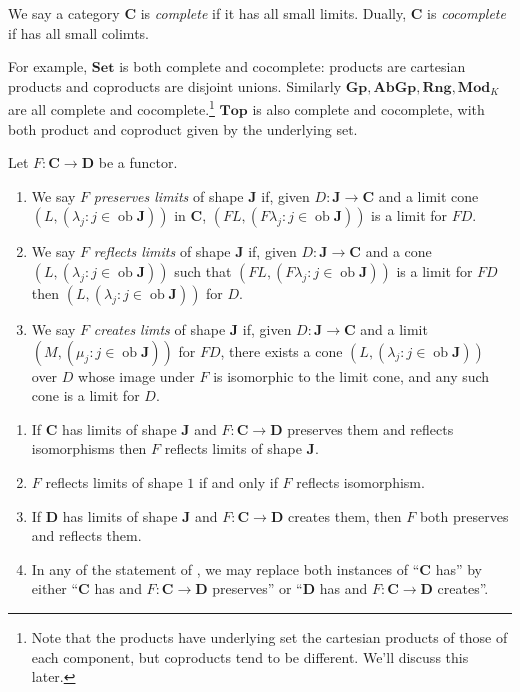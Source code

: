 \documentclass[a4paper]{article}
\renewcommand{\c}[1]{\mathbf{#1}}
\DeclareMathOperator{\ob}{ob}
\newcommand{\Set}{{\c{Set}}}
\newcommand{\Top}{{\c{Top}}}
\begin{document}
\begin{definition}
  We say a category \(\c C\) is \emph{complete} if it has all small limits. Dually, \(\c C\) is \emph{cocomplete} if has all small colimts.
\end{definition}

For example, \(\Set\) is both complete and cocomplete: products are cartesian products and coproducts are disjoint unions. Similarly \(\c{Gp}, \c{AbGp}, \c{Rng}, \c{Mod}_K\) are all complete and cocomplete.\footnote{Note that the products have underlying set the cartesian products of those of each component, but coproducts tend to be different. We'll discuss this later.} \(\Top\) is also complete and cocomplete, with both product and coproduct given by the underlying set.

\begin{definition}
  Let \(F: \c C \to \c D\) be a functor.
  \begin{enumerate}
  \item We say \(F\) \emph{preserves limits} of shape \(\c J\) if, given \(D: \c J \to \c C\) and a limit cone \((L, (\lambda_j: j \in \ob \c J))\) in \(\c C\), \((FL, (F\lambda_j: j \in \ob \c J))\) is a limit for \(FD\).
  \item We say \(F\) \emph{reflects limits} of shape \(\c J\) if, given \(D: \c J \to \c C\) and a cone \((L, (\lambda_j: j \in \ob \c J))\) such that \((FL, (F\lambda_j: j \in \ob \c J))\) is a limit for \(FD\) then \((L, (\lambda_j: j \in \ob \c J))\) for \(D\).
  \item We say \(F\) \emph{creates limts} of shape \(\c J\) if, given \(D: \c J \to \c C\) and a limit \((M, (\mu_j: j \in \ob \c J))\) for \(FD\), there exists a cone \((L, (\lambda_j: j \in \ob \c J))\) over \(D\) whose image under \(F\) is isomorphic to the limit cone, and any such cone is a limit for \(D\).
  \end{enumerate}
\end{definition}

\begin{remark}\leavevmode
  \begin{enumerate}
  \item If \(\c C\) has limits of shape \(\c J\) and \(F: \c C \to \c D\) preserves them and reflects isomorphisms then \(F\) reflects limits of shape \(\c J\).
  \item \(F\) reflects limits of shape \(1\) if and only if \(F\) reflects isomorphism.
  \item If \(\c D\) has limits of shape \(\c J\) and \(F: \c C \to \c D\) creates them, then \(F\) both preserves and reflects them.
  \item In any of the statement of , we may replace both instances of ``\(\c C\) has'' by either ``\(\c C\) has and \(F: \c C \to \c D\) preserves'' or ``\(\c D\) has and \(F: \c C \to \c D\) creates''.
  \end{enumerate}
\end{remark}
\end{document}
